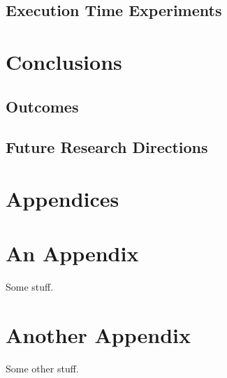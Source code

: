 \documentclass[11pt,twoside]{article}
\numberwithin{Theorem}{section}
\numberwithin{Definition}{section}
\numberwithin{Lemma}{section}
\numberwithin{Algorithm}{section}
\numberwithin{equation}{section}
\begin{document}
\subsection{Execution Time Experiments}

\section{Conclusions}

\subsection{Outcomes}

\subsection{Future Research Directions}
\clearpage

\printbibliography
\clearpage

\appendix
\section*{Appendices}

\clearpage
\section{An Appendix}
\label{app:one}

Some stuff.
\clearpage

\section{Another Appendix}
\label{app:two}

Some other stuff.
\end{document}
